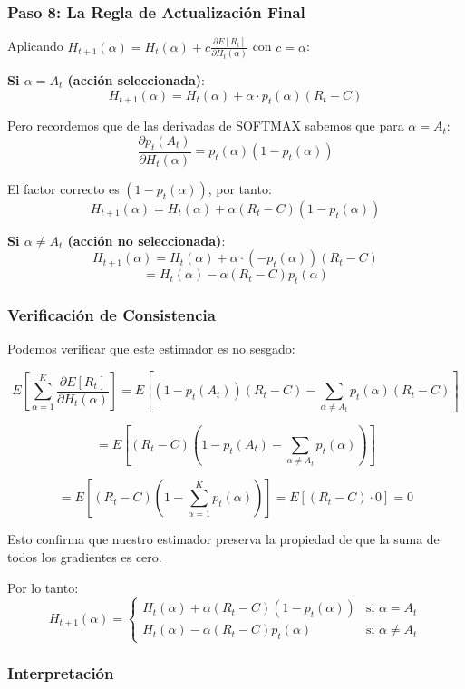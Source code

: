 \documentclass[12pt,a4paper]{article}
\begin{document}
\subsubsection{Paso 8: La Regla de Actualización Final}

Aplicando $H_{t+1}(\alpha) = H_t(\alpha) + c \frac{\partial E[R_t]}{\partial H_t(\alpha)}$ con $c = \alpha$:

\textbf{Si $\alpha = A_t$ (acción seleccionada)}:
$$H_{t+1}(\alpha) = H_t(\alpha) + \alpha \cdot p_t(\alpha)(R_t - C)$$

Pero recordemos que de las derivadas de SOFTMAX sabemos que para $\alpha = A_t$:
$$\frac{\partial p_t(A_t)}{\partial H_t(\alpha)} = p_t(\alpha)(1 - p_t(\alpha))$$

El factor correcto es $(1 - p_t(\alpha))$, por tanto:
$$H_{t+1}(\alpha) = H_t(\alpha) + \alpha(R_t - C)(1 - p_t(\alpha))$$

\textbf{Si $\alpha \neq A_t$ (acción no seleccionada)}:
$$H_{t+1}(\alpha) = H_t(\alpha) + \alpha \cdot (-p_t(\alpha))(R_t - C)$$
$$= H_t(\alpha) - \alpha(R_t - C)p_t(\alpha)$$

\subsubsection{Verificación de Consistencia}

Podemos verificar que este estimador es no sesgado:

$$E\left[\sum_{\alpha=1}^{K} \frac{\partial E[R_t]}{\partial H_t(\alpha)}\right] = E\left[(1-p_t(A_t))(R_t - C) - \sum_{\alpha \neq A_t} p_t(\alpha)(R_t - C)\right]$$

$$= E\left[(R_t - C)\left(1 - p_t(A_t) - \sum_{\alpha \neq A_t} p_t(\alpha)\right)\right]$$

$$= E\left[(R_t - C)(1 - \sum_{\alpha=1}^{K} p_t(\alpha))\right] = E[(R_t - C) \cdot 0] = 0$$

Esto confirma que nuestro estimador preserva la propiedad de que la suma de todos los gradientes es cero.

Por lo tanto:
$$H_{t+1}(\alpha) = \begin{cases}
H_t(\alpha) + \alpha(R_t - C)(1 - p_t(\alpha)) & \text{si } \alpha = A_t \\
H_t(\alpha) - \alpha(R_t - C)p_t(\alpha) & \text{si } \alpha \neq A_t
\end{cases}$$

\subsubsection{Interpretación}
\end{document}
